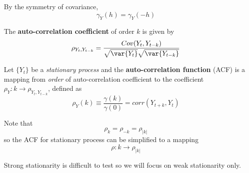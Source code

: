 \documentclass[11pt]{article}
\begin{document}
		\begin{proposition}
			By the symmetry of covariance, 
			\begin{equation}
				\gamma_Y(h) = \gamma_Y(-h)
			\end{equation}
		\end{proposition}
		
		\begin{definition}
			The \textbf{auto-correlation coefficient} of order $k$ is given by
			\begin{equation}
				\rho_{Y_t, Y_{t-k}} = \frac{Cov(Y_t, Y_{t-k})}{\sqrt{\var{Y_t}}\sqrt{\var{Y_{t-k}}}}
			\end{equation}
		\end{definition}
		
		\begin{definition}
			Let $\{Y_t\}$ be a \emph{stationary process} and the \textbf{auto-correlation function} (ACF) is a mapping from \emph{order} of auto-correlation coefficient to the coefficient $\rho_Y: k \to \rho_{Y_t, Y_{t-k}}$, defined as
			\begin{equation}
				\rho_Y(k) \equiv \frac{\gamma(k)}{\gamma(0)} = corr(Y_{t + k}, Y_t)
			\end{equation}
		\end{definition}
		
		\begin{proposition}
			Note that 
			\begin{equation}
				\rho_k = \rho_{-k} = \rho_{|k|}
			\end{equation}
			so the ACF for stationary process can be simplified to a mapping 
			\begin{equation}
				\rho: k \to \rho_{|k|}
			\end{equation}
		\end{proposition}
		
		\begin{remark}
			Strong stationarity is difficult to test so we will focus on weak stationarity only.
		\end{remark}
		
\end{document}
